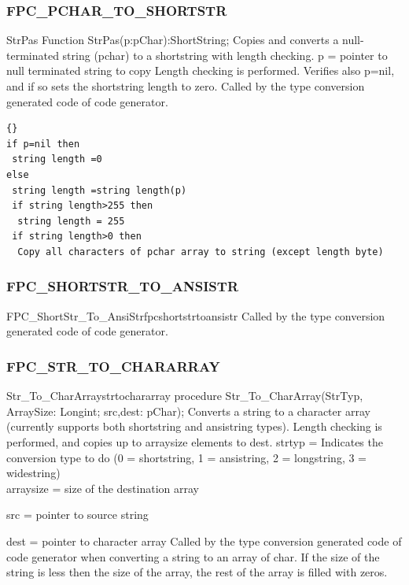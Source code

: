 \documentclass [a4paper,12pt]{article}
\begin{document}
\subsubsection{FPC{\_}PCHAR{\_}TO{\_}SHORTSTR}
\label{subsubsec:mylabel44}

\begin{function}{StrPas}
\Declaration
Function StrPas(p:pChar):ShortString;
\Description
Copies and converts a null-terminated string (pchar) to a shortstring with
length checking.
\Parameters
p = pointer to null terminated string to copy
\Notes
Length checking is performed. Verifies also p=nil, and if so sets the
shortstring length to zero. Called by the type conversion generated code of
code generator.
\Algorithm
\begin{lstlisting}{}
if p=nil then
 string length =0
else
 string length =string length(p)
 if string length>255 then
  string length = 255
 if string length>0 then
  Copy all characters of pchar array to string (except length byte)
\end{lstlisting}
\end{function}

\subsubsection{FPC{\_}SHORTSTR{\_}TO{\_}ANSISTR}
\label{subsubsec:mylabel45}

\begin{functionl}{FPC{\_}ShortStr{\_}To{\_}AnsiStr}{fpcshortstrtoansistr}
\Notes
Called by the type conversion generated code of code generator.
\end{functionl}

\subsubsection{FPC{\_}STR{\_}TO{\_}CHARARRAY}
\label{subsubsec:mylabel46}

\begin{procedurel}{Str{\_}To{\_}CharArray}{strtochararray}
\Declaration
procedure Str{\_}To{\_}CharArray(StrTyp, ArraySize: Longint; src,dest: pChar);
\Description
Converts a string to a character array (currently supports both shortstring and ansistring types). Length checking is performed, and copies up to \textsf{arraysize} elements to dest.
\Parameters
strtyp = Indicates the conversion type to do (0 = shortstring, 1 =
ansistring, 2 = longstring, 3 = widestring) \\
arraysize = size of the destination array \par
src = pointer to source string \par
dest = pointer to character array
\Notes
Called by the type conversion generated code of code generator when
converting a string to an array of char. If the size of the string is less
then the size of the array, the rest of the array is filled with zeros.
\end{procedurel}
\end{document}
